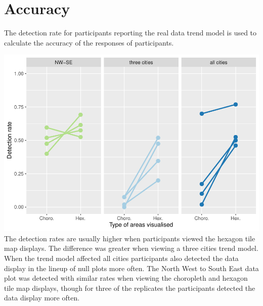 \documentclass[conference,final,]{IEEEtran}
\makeatletter
\def\maxwidth{\ifdim\Gin@nat@width>\linewidth\linewidth
\else\Gin@nat@width\fi}
\let\Oldincludegraphics\includegraphics
\renewcommand{\includegraphics}[1]{\Oldincludegraphics[width=\maxwidth]{#1}}
\makeatother
\begin{document}
\hypertarget{accuracy}{%
\section{Accuracy}\label{accuracy}}

The detection rate for participants reporting the real data trend model
is used to calculate the accuracy of the responses of participants.

\includegraphics{paper_files/figure-latex/detection_compare-1.pdf} The
detection rates are usually higher when participants viewed the hexagon
tile map displays. The difference was greater when viewing a three
cities trend model. When the trend model affected all cities
participants also detected the data display in the lineup of null plots
more often. The North West to South East data plot was detected with
similar rates when viewing the choropleth and hexagon tile map displays,
though for three of the replicates the participants detected the data
display more often.
\end{document}

